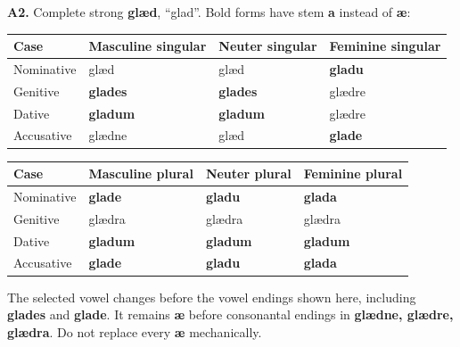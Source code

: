 \par\begin{minipage}{\linewidth}\raggedright
\textbf{A2.} Complete strong \textbf{glæd}, “glad”. Bold forms have stem \textbf{a} instead of \textbf{æ}:

\par\begingroup
\fontsize{10.5}{13.2}\selectfont
\setlength{\LTleft}{0pt}\setlength{\LTright}{\fill}
\noindent
\begin{tabular}{@{}>{\raggedright\arraybackslash}p{22.0mm}>{\raggedright\arraybackslash}p{31.188mm}>{\raggedright\arraybackslash}p{31.188mm}>{\raggedright\arraybackslash}p{31.188mm}@{}}
\toprule
\textbf{Case} & \textbf{Masculine singular} & \textbf{Neuter singular} & \textbf{Feminine singular} \\
\midrule
Nominative & glæd & glæd & \textbf{gladu} \\
Genitive & \textbf{glades} & \textbf{glades} & glædre \\
Dative & \textbf{gladum} & \textbf{gladum} & glædre \\
Accusative & glædne & glæd & \textbf{glade} \\
\bottomrule
\end{tabular}
\par\endgroup
\par\addvspace{5pt}
\par\begingroup
\fontsize{10.5}{13.2}\selectfont
\setlength{\LTleft}{0pt}\setlength{\LTright}{\fill}
\noindent
\begin{tabular}{@{}>{\raggedright\arraybackslash}p{22.0mm}>{\raggedright\arraybackslash}p{31.188mm}>{\raggedright\arraybackslash}p{31.188mm}>{\raggedright\arraybackslash}p{31.188mm}@{}}
\toprule
\textbf{Case} & \textbf{Masculine plural} & \textbf{Neuter plural} & \textbf{Feminine plural} \\
\midrule
Nominative & \textbf{glade} & \textbf{gladu} & \textbf{glada} \\
Genitive & glædra & glædra & glædra \\
Dative & \textbf{gladum} & \textbf{gladum} & \textbf{gladum} \\
Accusative & \textbf{glade} & \textbf{gladu} & \textbf{glada} \\
\bottomrule
\end{tabular}
\par\endgroup
The selected vowel changes before the vowel endings shown here, including \textbf{glades} and \textbf{glade}. It remains \textbf{æ} before consonantal endings in \textbf{glædne, glædre, glædra}. Do not replace every \textbf{æ} mechanically.

\end{minipage}\par\addvspace{4pt}

